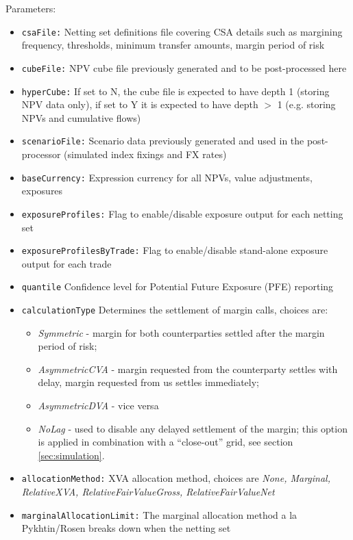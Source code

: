 {Parameters:
\begin{itemize}
\item {\tt csaFile:} Netting set definitions file covering CSA details such as margining frequency, thresholds, minimum
transfer amounts, margin period of risk
\item {\tt cubeFile:} NPV cube file previously generated and to be post-processed here
\item {\tt hyperCube:} If set to N, the cube file is expected to have depth 1 (storing NPV data only), if set to Y it is
expected to have depth $>$ 1 (e.g. storing NPVs and cumulative flows)
\item {\tt scenarioFile:} Scenario data previously generated and used in the post-processor (simulated index fixings and
FX rates)
\item {\tt baseCurrency:} Expression currency for all NPVs, value adjustments, exposures
\item {\tt exposureProfiles:} Flag to enable/disable exposure output for each netting set
\item {\tt exposureProfilesByTrade:} Flag to enable/disable stand-alone exposure output for each trade
\item {\tt quantile} Confidence level for Potential Future Exposure (PFE) reporting
\item {\tt calculationType} Determines the settlement of margin calls, choices are: \\
	\begin{itemize}
	\item {\em Symmetric} - margin for both counterparties settled after the margin period of risk; 
	\item {\em AsymmetricCVA} - margin requested from the counterparty settles with delay,
	margin requested from us settles immediately; 
	\item {\em AsymmetricDVA} - vice versa 
	\item {\em NoLag} - used to disable any delayed settlement of the margin; this option is applied in combination with a ``close-out'' grid, see section \ref{sec:simulation}. 
	\end{itemize}
\item {\tt allocationMethod:} XVA allocation method, choices are {\em None, Marginal, RelativeXVA, RelativeFairValueGross, RelativeFairValueNet}
\item {\tt marginalAllocationLimit:} The marginal allocation method a la Pykhtin/Rosen breaks down when the netting set

\end{itemize}}
